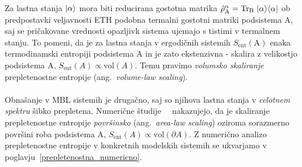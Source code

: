 Za lastna stanja $\vert\alpha\rangle$ mora biti reducirana gostotna matrika $\hat{\rho}_\mathrm{A}^\alpha=\mathrm{Tr}_\mathrm{B}\ \ket{\alpha}\bra{\alpha}$ ob predpostavki veljavnosti ETH podobna termalni gostotni matriki podsistema A, saj se pričakovane vrednosti opazljivk
  sistema 
ujemajo s tistimi v termalnem stanju.
To pomeni, da je za lastna stanja v ergodičnih sistemih $S_\mathrm{ent}(\mathrm{A})$ enaka termodinamski entropiji podsistema A in je zato ekstenzivna - skalira z velikostjo
podsistema A, $S_\mathrm{ent}(A)\propto \mathrm{vol}(A).$ Temu pravimo \emph{volumsko skaliranje} prepletenostne entropije (ang.~\emph{volume-law scaling}). \\\\Obnašanje v 
MBL sistemih je drugačno, saj so njihova lastna stanja v \emph{celotnem spektru} šibko prepletena. Numerične študije~\cite{serbyn2013local}~\cite{bauer2013area} nakazujejo, da je skaliranje prepletenostne entropije \emph{površinsko} (ang.~\emph{area-law scaling}) oziroma sorazmerno površini roba podsistema A, $S_\mathrm{ent}(A)\propto \mathrm{vol}(\partial A)$. Z numerično analizo prepletenostne entropije v konkretnih modelskih sistemih se ukvarjamo v poglavju~\ref{prepletenostna_numericno}.


